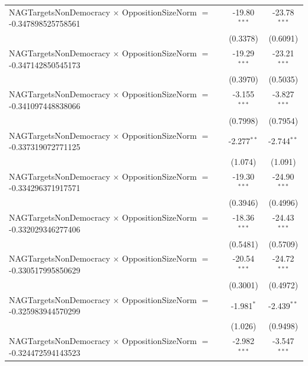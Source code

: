 \begin{tabular}{lcc}
   NAGTargetsNonDemocracy $\times$ OppositionSizeNorm $=$ -0.347898525758561    & -19.80$^{***}$       & -23.78$^{***}$\\   
                                                                                & (0.3378)             & (0.6091)\\   
   NAGTargetsNonDemocracy $\times$ OppositionSizeNorm $=$ -0.347142850545173    & -19.29$^{***}$       & -23.21$^{***}$\\   
                                                                                & (0.3970)             & (0.5035)\\   
   NAGTargetsNonDemocracy $\times$ OppositionSizeNorm $=$ -0.341097448838066    & -3.155$^{***}$       & -3.827$^{***}$\\   
                                                                                & (0.7998)             & (0.7954)\\   
   NAGTargetsNonDemocracy $\times$ OppositionSizeNorm $=$ -0.337319072771125    & -2.277$^{**}$        & -2.744$^{**}$\\   
                                                                                & (1.074)              & (1.091)\\   
   NAGTargetsNonDemocracy $\times$ OppositionSizeNorm $=$ -0.334296371917571    & -19.30$^{***}$       & -24.90$^{***}$\\   
                                                                                & (0.3946)             & (0.4996)\\   
   NAGTargetsNonDemocracy $\times$ OppositionSizeNorm $=$ -0.332029346277406    & -18.36$^{***}$       & -24.43$^{***}$\\   
                                                                                & (0.5481)             & (0.5709)\\   
   NAGTargetsNonDemocracy $\times$ OppositionSizeNorm $=$ -0.330517995850629    & -20.54$^{***}$       & -24.72$^{***}$\\   
                                                                                & (0.3001)             & (0.4972)\\   
   NAGTargetsNonDemocracy $\times$ OppositionSizeNorm $=$ -0.325983944570299    & -1.981$^{*}$         & -2.439$^{**}$\\   
                                                                                & (1.026)              & (0.9498)\\   
   NAGTargetsNonDemocracy $\times$ OppositionSizeNorm $=$ -0.324472594143523    & -2.982$^{***}$       & -3.547$^{***}$\\   

\end{tabular}
